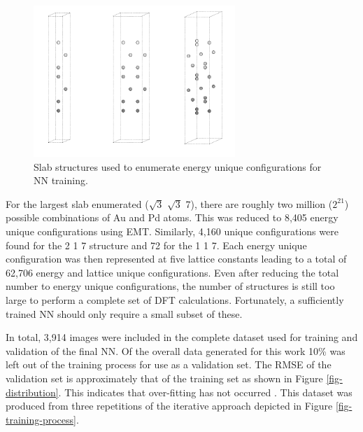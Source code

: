 \documentclass[12pt]{cmuthesis}
\begin{document}
\begin{figure}[h]
\centering
\includegraphics[width=3in]{./images/EMT-structures.png}
\caption{\label{fig-EMT-structures}
Slab structures used to enumerate energy unique configurations for NN training.}
\end{figure}

For the largest slab enumerated (\(\sqrt{3}\) \texttimes{} \(\sqrt{3}\) \texttimes{} 7), there are roughly two million (\(2^{21}\)) possible combinations of Au and Pd atoms. This was reduced to 8,405 energy unique configurations using EMT. Similarly, 4,160 unique configurations were found for the 2 \texttimes{} 1 \texttimes{} 7 structure and 72 for the 1 \texttimes{} 1 \texttimes{} 7. Each energy unique configuration was then represented at five lattice constants leading to a total of 62,706 energy and lattice unique configurations. Even after reducing the total number to energy unique configurations, the number of structures is still too large to perform a complete set of DFT calculations. Fortunately, a sufficiently trained NN should only require a small subset of these.

In total, 3,914 images were included in the complete dataset used for training and validation of the final NN. Of the overall data generated for this work 10\% was left out of the training process for use as a validation set. The RMSE of the validation set is approximately that of the training set as shown in Figure \ref{fig-distribution}. This indicates that over-fitting has not occurred \cite{behler-2015-const}. This dataset was produced from three repetitions of the iterative approach depicted in Figure \ref{fig-training-process}.
\end{document}
